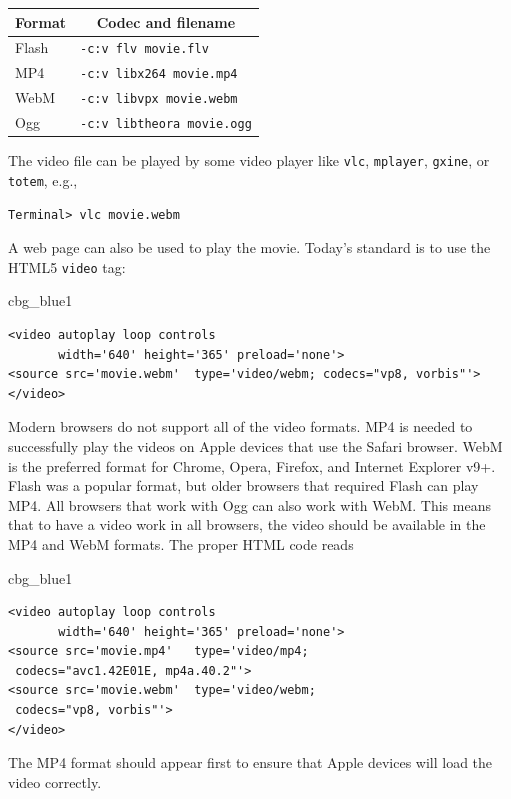 \documentclass[%
oneside,                 %
final,                   %
10pt]{article}
\newenvironment{_cod_tight}[1]{
   \def\FrameCommand{\colorbox{#1}}
   \FrameRule0.6pt\MakeFramed {\FrameRestore}\vskip3mm}
   {\vskip0mm\endMakeFramed}
\newenvironment{cod}[1]{
\bgroup\rmfamily
\fboxsep=0mm\relax
\begin{_cod_tight}{#1}
\list{}{\parsep=-2mm\parskip=0mm\topsep=0pt\leftmargin=2mm
\rightmargin=2\leftmargin\leftmargin=4pt\relax}
\item\relax}
{\endlist\end{_cod_tight}\egroup}
\begin{document}
\begin{center}
\begin{tabular}{ll}
\hline
\multicolumn{1}{c}{ Format } & \multicolumn{1}{c}{ Codec and filename } \\
\hline
Flash  & \texttt{-c:v flv movie.flv}       \\
MP4    & \texttt{-c:v libx264 movie.mp4}   \\
WebM   & \texttt{-c:v libvpx movie.webm}   \\
Ogg    & \texttt{-c:v libtheora movie.ogg} \\
\hline
\end{tabular}
\end{center}

\noindent
{}

The video file can be played by some video player like \texttt{vlc}, \texttt{mplayer},
\texttt{gxine}, or \texttt{totem}, e.g.,

\begin{Verbatim}[frame=lines,label=\fbox{{\tiny Terminal}},framesep=2.5mm,framerule=0.7pt,fontsize=\fontsize{9pt}{9pt}]
Terminal> vlc movie.webm
\end{Verbatim}
A web page can also be used to play the movie. Today's standard is
to use the HTML5 \texttt{video} tag:

\begin{cod}{cbg_blue1}\begin{Verbatim}[numbers=none,fontsize=\fontsize{9pt}{9pt},baselinestretch=0.95,xleftmargin=2mm]
<video autoplay loop controls
       width='640' height='365' preload='none'>
<source src='movie.webm'  type='video/webm; codecs="vp8, vorbis"'>
</video>
\end{Verbatim}
\end{cod}
\noindent
Modern browsers do not support all of the video formats.
MP4 is needed to successfully play the videos on Apple devices
that use the Safari browser.
WebM is the preferred format for Chrome, Opera, Firefox, and Internet
Explorer v9+. Flash was a popular format, but older browsers that
required Flash can play MP4. All browsers that work with Ogg can also
work with WebM. This means that to have a video work in all browsers,
the video should be available in the MP4 and WebM formats.
The proper HTML code reads

\begin{cod}{cbg_blue1}\begin{Verbatim}[numbers=none,fontsize=\fontsize{9pt}{9pt},baselinestretch=0.95,xleftmargin=2mm]
<video autoplay loop controls
       width='640' height='365' preload='none'>
<source src='movie.mp4'   type='video/mp4;
 codecs="avc1.42E01E, mp4a.40.2"'>
<source src='movie.webm'  type='video/webm;
 codecs="vp8, vorbis"'>
</video>
\end{Verbatim}
\end{cod}
\noindent
The MP4 format should appear first to ensure that Apple devices will
load the video correctly.
\end{document}
